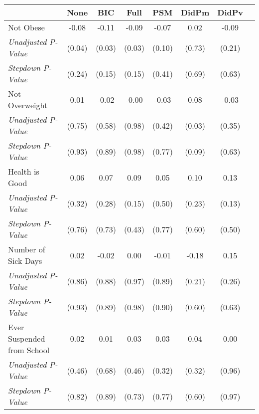 \begin{tabular}{l c c c c c c c}
\toprule
 & None & BIC & Full & PSM & DidPm & DidPv \\
\midrule
Not Obese & -0.08 & -0.11 & -0.09 & -0.07 & 0.02 & -0.09 \\
\quad \textit{Unadjusted P-Value} & (0.04) & (0.03) & (0.03) & (0.10) & (0.73) & (0.21) \\
\quad \textit{Stepdown P-Value} & (0.24) & (0.15) & (0.15) & (0.41) & (0.69) & (0.63) \\
Not Overweight & 0.01 & -0.02 & -0.00 & -0.03 & 0.08 & -0.03 \\
\quad \textit{Unadjusted P-Value} & (0.75) & (0.58) & (0.98) & (0.42) & (0.03) & (0.35) \\
\quad \textit{Stepdown P-Value} & (0.93) & (0.89) & (0.98) & (0.77) & (0.09) & (0.63) \\
Health is Good & 0.06 & 0.07 & 0.09 & 0.05 & 0.10 & 0.13 \\
\quad \textit{Unadjusted P-Value} & (0.32) & (0.28) & (0.15) & (0.50) & (0.23) & (0.13) \\
\quad \textit{Stepdown P-Value} & (0.76) & (0.73) & (0.43) & (0.77) & (0.60) & (0.50) \\
Number of Sick Days & 0.02 & -0.02 & 0.00 & -0.01 & -0.18 & 0.15 \\
\quad \textit{Unadjusted P-Value} & (0.86) & (0.88) & (0.97) & (0.89) & (0.21) & (0.26) \\
\quad \textit{Stepdown P-Value} & (0.93) & (0.89) & (0.98) & (0.90) & (0.60) & (0.63) \\
Ever Suspended from School & 0.02 & 0.01 & 0.03 & 0.03 & 0.04 & 0.00 \\
\quad \textit{Unadjusted P-Value} & (0.46) & (0.68) & (0.46) & (0.32) & (0.32) & (0.96) \\
\quad \textit{Stepdown P-Value} & (0.82) & (0.89) & (0.73) & (0.77) & (0.60) & (0.97) \\
\bottomrule
\end{tabular}
